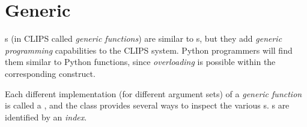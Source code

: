 \section{Generic\label{pyclips-cl-Generic}}

s (in CLIPS called \emph{generic functions}) are similar
to s, but they add \emph{generic programming} capabilities
to the CLIPS system. Python programmers will find them similar to Python
functions, since \emph{overloading} is possible within the corresponding
construct.

Each different implementation (for different argument sets) of a
\emph{generic function} is called a , and the 
class provides several ways to inspect the various s.
s are identified by an \emph{index}.

